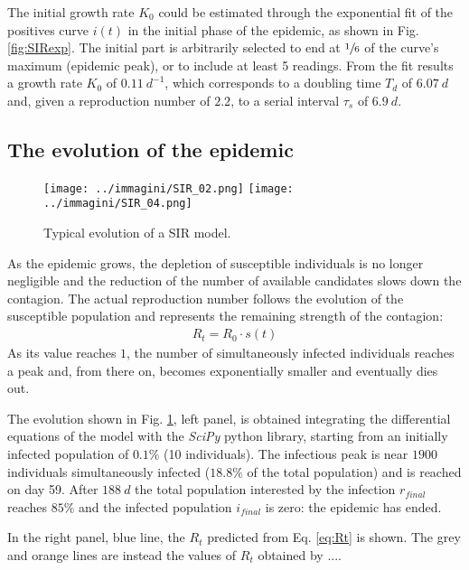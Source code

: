 \documentclass[DIV=12, BCOR=0pt]{scrartcl}  %
\begin{document}
	The initial growth rate $K_{0}$ could be estimated through the exponential fit of the positives curve $i(t)$ in the initial phase of the epidemic, as shown in Fig. \ref{fig:SIRexp}. The initial part is arbitrarily selected to end at $\sfrac{1}{6}$ of the curve's maximum (epidemic peak), or to include at least 5 readings. From the fit results a growth rate $K_{0}$ of $0.11 \ d^{-1}$, which corresponds to a doubling time $T_{d}$ of $6.07 \ d$ and, given a reproduction number of $2.2$, to a serial interval $\tau_{s}$ of $6.9 \ d$.



  \subsection{The evolution of the epidemic}
  
  \begin{figure}[h!]
  	\centering
  	\texttt{[image: ../immagini/SIR\_02.png]}
  	\texttt{[image: ../immagini/SIR\_04.png]}
  	\caption{Typical evolution of a SIR model. }
  	\label{fig:SIRtot}
  \end{figure}

  As the epidemic grows, the depletion of susceptible individuals is no longer negligible and the reduction of the number of available candidates slows down the contagion.
  The actual reproduction number follows the evolution of the susceptible population and represents the remaining strength of the contagion:
  \begin{align}
		R_{t} = R_{0} \cdot s(t) 
		\label{eq:Rt}
  \end{align}
  As its value reaches $1$, the number of simultaneously infected individuals reaches a peak and, from there on, becomes exponentially smaller and eventually dies out.
  
  The evolution shown in Fig. \ref{fig:SIRtot}, left panel, is obtained integrating the differential equations of the model with the \textit{SciPy} python library, starting from an initially infected population of $0.1 \%$ (10 individuals). The infectious peak is near $1900$ individuals simultaneously infected ($18.8 \%$ of the total population) and is reached on day 59. After $188 \ d$ the total population interested by the infection $r_{final}$ reaches $85 \%$ and the infected population $i_{final}$ is zero: the epidemic has ended. 
  
  In the right panel, blue line, the $R_{t}$ predicted from Eq. \ref{eq:Rt} is shown. The grey and orange lines are instead the values of $R_{t}$ obtained by ....
\end{document}
